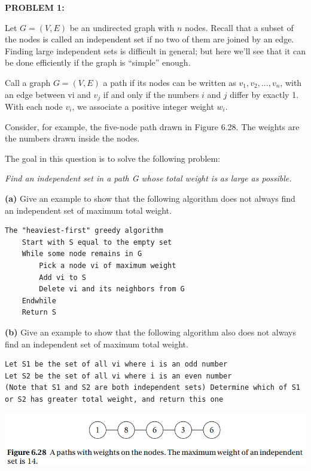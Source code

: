 \documentclass[11pt]{article}
\begin{document}
\noindent \textbf{PROBLEM 1:} 

\vspace{2mm}

Let $G = (V, E)$ be an undirected graph with $n$ nodes.  Recall that a subset of the nodes is called an independent set if no two of them are joined by an edge. Finding large independent sets is difficult in general; but here we'll see that it can be done efficiently if the graph is ``simple'' enough. 

Call a graph $G = (V, E)$ a path if its nodes can be written as $v_1, v_2, ...,v_n$, with an edge between vi and $v_j$ if and only if the numbers $i$ and $j$ differ by exactly 1. With each node $v_i$, we associate a positive integer weight $w_i$. 

Consider, for example, the five-node path drawn in Figure 6.28. The weights are the numbers drawn inside the nodes. 

The goal in this question is to solve the following problem:

\vspace{2mm}

\emph{Find an independent set in a path G whose total weight is as large as possible.}

\vspace{2mm}

\noindent \textbf{(a)} Give an example to show that the following algorithm does not always find an independent set of maximum total weight.

\begin{lstlisting}
The "heaviest-first" greedy algorithm 
	Start with S equal to the empty set 
	While some node remains in G 
		Pick a node vi of maximum weight 
		Add vi to S 
		Delete vi and its neighbors from G 
	Endwhile 
	Return S
\end{lstlisting}

\noindent \textbf{(b)} Give an example to show that the following algorithm also does not always find an independent set of maximum total weight.

\begin{lstlisting}
Let S1 be the set of all vi where i is an odd number 
Let S2 be the set of all vi where i is an even number 
(Note that S1 and S2 are both independent sets) Determine which of S1 or S2 has greater total weight, and return this one

\end{lstlisting}

\includegraphics[scale=0.75]{1.png}
\end{document}
